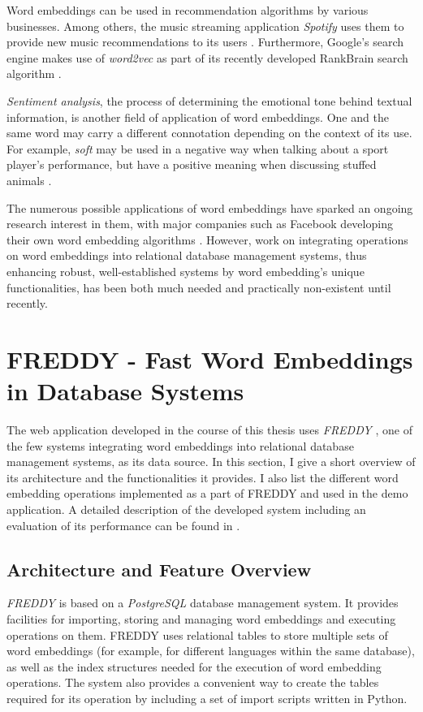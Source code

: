 Word embeddings can be used in recommendation algorithms by various businesses. Among others, the music streaming application \textit{Spotify} uses them to provide new music recommendations to its users \cite{spotify-word2vec}. Furthermore, Google's search engine makes use of \textit{word2vec} as part of its recently developed RankBrain search algorithm \cite{rankbrain-seo}.

\textit{Sentiment analysis}, the process of determining the emotional tone behind textual information, is another field of application of word embeddings. One and the same word may carry a different connotation depending on the context of its use. For example, \textit{soft} may be used in a negative way when talking about a sport player's performance, but have a positive meaning when discussing stuffed animals \cite{hamilton2016inducing}. 

The numerous possible applications of word embeddings have sparked an ongoing research interest in them, with major companies such as Facebook developing their own word embedding algorithms \cite{deeptext}. However, work on integrating operations on word embeddings into relational database management systems, thus enhancing robust, well-established systems by word embedding's unique functionalities, has been both much needed and practically non-existent until recently.

\section{FREDDY - Fast Word Embeddings in Database Systems}
The web application developed in the course of this thesis uses \textit{FREDDY} \cite{Gunther:2018:FFW:3183713.3183717}, one of the few systems integrating word embeddings into relational database management systems, as its data source. In this section, I give a short overview of its architecture and the functionalities it provides. I also list the different word embedding operations implemented as a part of FREDDY and used in the demo application. A detailed description of the developed system including an evaluation of its performance can be found in \cite{freddy-diplomarbeit}.

\subsection{Architecture and Feature Overview}
\textit{FREDDY} is based on a \textit{PostgreSQL} database management system. It provides facilities for importing, storing and managing word embeddings and executing operations on them. FREDDY uses relational tables to store multiple sets of word embeddings (for example, for different languages within the same database), as well as the index structures needed for the execution of word embedding operations. The system also provides a convenient way to create the tables required for its operation by including a set of import scripts written in Python.

